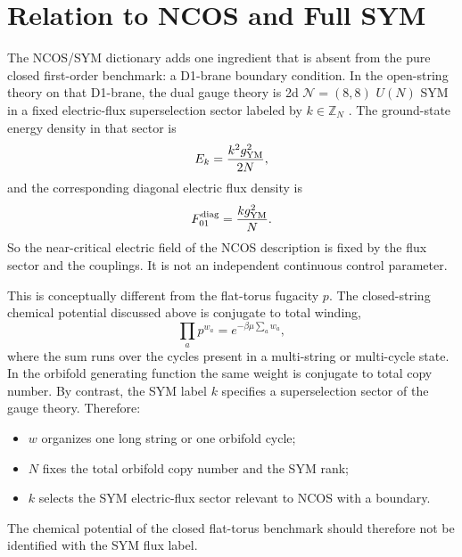 \documentclass[11pt]{article}
\begin{document}
\section{Relation to NCOS and Full SYM}
The NCOS/SYM dictionary adds one ingredient that is absent from the pure closed first-order benchmark: a D1-brane boundary condition. In the open-string theory on that D1-brane, the dual gauge theory is 2d $\mathcal N=(8,8)$ $U(N)$ SYM in a fixed electric-flux superselection sector labeled by $k\in \mathbb Z_N$ \cite{seiberg2000stringsbackgroundelectricfield,klebanov200011dimensionalncosun,gopakumar2000sdualitynoncommutativegaugetheory,yin2026foundationsofstringtheory,cho2026fluxsectorsmatrixstring}. The ground-state energy density in that sector is
\begin{equation}\label{eq:sym-flux-energy-note}
E_k=\frac{k^2 g_{\rm YM}^2}{2N},
\end{equation}
and the corresponding diagonal electric flux density is
\begin{equation}\label{eq:sym-flux-density-note}
F_{01}^{\rm diag}=\frac{k g_{\rm YM}^2}{N}.
\end{equation}
So the near-critical electric field of the NCOS description is fixed by the flux sector and the couplings. It is not an independent continuous control parameter.

This is conceptually different from the flat-torus fugacity $p$. The closed-string chemical potential discussed above is conjugate to total winding,
\begin{equation}\label{eq:total-winding-weight-note}
\prod_a p^{w_a}=e^{-\beta\mu\sum_a w_a},
\end{equation}
where the sum runs over the cycles present in a multi-string or multi-cycle state. In the orbifold generating function the same weight is conjugate to total copy number. By contrast, the SYM label $k$ specifies a superselection sector of the gauge theory. Therefore:
\begin{itemize}
\item $w$ organizes one long string or one orbifold cycle;
\item $N$ fixes the total orbifold copy number and the SYM rank;
\item $k$ selects the SYM electric-flux sector relevant to NCOS with a boundary.
\end{itemize}
The chemical potential of the closed flat-torus benchmark should therefore not be identified with the SYM flux label.
\end{document}
